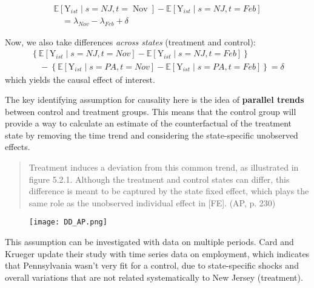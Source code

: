 \documentclass[11pt, a4paper]{report}
\theoremstyle{plain}
\theoremstyle{plain}
\theoremstyle{remark}
\begin{document}
\begin{equation}
    \begin{array}{l}
        \mathbb{E}\left[\mathrm{Y}_{i s t} \mid s=N J, t=\operatorname{Nov}\right]-\mathbb{E}\left[\mathrm{Y}_{i s t} \mid s=N J, t=F e b\right] \\
    \quad=\lambda_{N o v}-\lambda_{F e b}+\delta
    \end{array}
    \end{equation}

Now, we also take differences \textit{across states} (treatment and control):
\begin{equation}
    \begin{array}{l}
    \left\{\mathbb{E}\left[\mathrm{Y}_{i s t} \mid s=N J, t=N o v\right]-\mathbb{E}\left[\mathrm{Y}_{i s t} \mid s=N J, t=F e b\right]\right\} \\
    \quad-\left\{\mathbb{E}\left[\mathrm{Y}_{i s t} \mid s=P A, t=N o v\right]-\mathbb{E}\left[\mathrm{Y}_{i s t} \mid s=P A, t=F e b\right]\right\}=\delta
    \end{array}
    \end{equation}
which yields the causal effect of interest.


The key identifying assumption for causality here is
the idea of \textbf{parallel trends} between control and treatment groups. This means that the control group will provide a way to calculate an estimate of the counterfactual of the treatment state by removing the time trend and considering the state-specific unobserved effects.

\begin{quote}
    Treatment induces a deviation from this
    common trend, as illustrated in figure 5.2.1. Although the
    treatment and control states can differ, this difference is meant
    to be captured by the state fixed effect, which plays the same
    role as the unobserved individual effect in [FE]. (AP, p. 230)
\end{quote}

\begin{figure}[h!]
    \texttt{[image: DD\_AP.png]}
\end{figure}

This assumption can be investigated with data on multiple periods. Card and Krueger update their study with time series data on employment, which indicates that Pennsylvania wasn't very fit for a control, due to state-specific shocks and overall variations that are not related systematically to New Jersey (treatment). 
\end{document}
